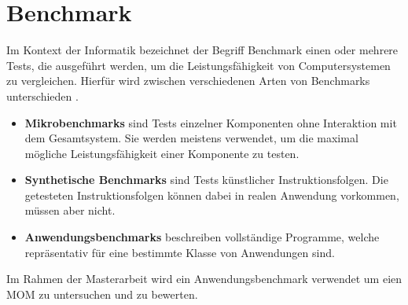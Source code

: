 \section{Benchmark}
Im Kontext der Informatik bezeichnet der Begriff Benchmark einen oder mehrere Tests, die ausgeführt werden, um die Leistungsfähigkeit von Computersystemen zu vergleichen. Hierfür wird zwischen verschiedenen Arten von Benchmarks unterschieden \cite{Lilja2004}. 
\begin{itemize}
\item \textbf{Mikrobenchmarks} sind Tests einzelner Komponenten ohne Interaktion mit dem Gesamtsystem. Sie werden meistens verwendet, um die maximal mögliche Leistungsfähigkeit einer Komponente zu testen.
\item \textbf{Synthetische Benchmarks} sind Tests künstlicher Instruktionsfolgen. Die getesteten Instruktionsfolgen können dabei in realen Anwendung vorkommen, müssen aber nicht.
\item \textbf{Anwendungsbenchmarks} beschreiben vollständige Programme, welche repräsentativ für eine bestimmte Klasse von Anwendungen sind. 
\end{itemize}
Im Rahmen der Masterarbeit wird ein Anwendungsbenchmark verwendet um eien MOM zu untersuchen und zu bewerten.




